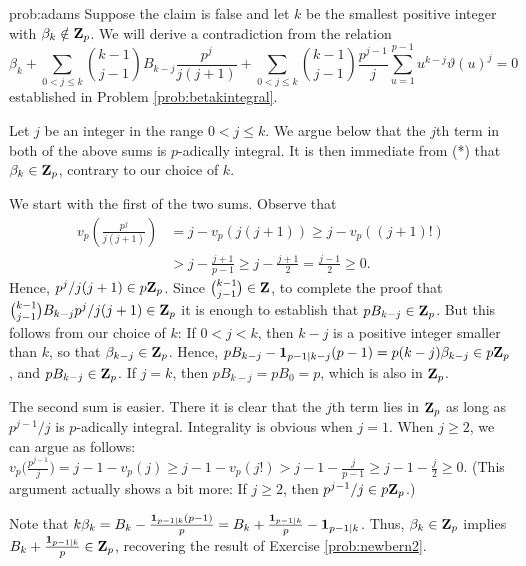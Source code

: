 \begin{sol}{prob:adams} Suppose the claim is false and let $k$ be the smallest positive integer with $\beta_k\notin \mathbf{Z}_{p}$. We will derive a contradiction from the relation
\begin{equation}\tag{*} \beta_k + \sum_{0 < j \le k} \binom{k-1}{j-1} B_{k-j}\frac{p^{j}}{j(j+1)}+\sum_{0 < j \le k}\binom{k-1}{j-1}\frac{p^{j-1}}{j}\sum_{u=1}^{p-1}u^{k-j}\vartheta(u)^j =0\end{equation}
established in Problem \ref{prob:betakintegral}.

Let $j$ be an integer in the range $0 < j \le k$. We argue below that the $j$th term in both of the above sums is $p$-adically integral. It is then immediate from (*) that $\beta_{k} \in \mathbf{Z}_{p}$, contrary to our choice of $k$.

We start with the first of the two sums. Observe that
\begin{align*} v_p\left(\frac{p^j}{j(j+1)}\right) &= j - v_p(j(j+1)) \ge j - v_p((j+1)!) \\&> j - \frac{j+1}{p-1} \ge j -\frac{j+1}{2} = \frac{j-1}{2} \ge 0. \end{align*}
Hence, $p^j/j(j+1) \in p\mathbf{Z}_{p}$. Since $\binom{k-1}{j-1} \in \mathbf{Z}$, to complete the proof that $\binom{k-1}{j-1} B_{k-j} p^j/j(j+1) \in \mathbf{Z}_{p}$ it is enough to establish that $pB_{k-j} \in \mathbf{Z}_{p}$. But this follows from our choice of $k$: If $0 < j < k$, then $k-j$ is a positive integer smaller than $k$, so that $\beta_{k-j} \in \mathbf{Z}_{p}$. Hence, $pB_{k-j} - \mathbf{1}_{p-1\mid k-j}(p-1) = p(k-j)\beta_{k-j}  \in p\mathbf{Z}_{p}$, and $pB_{k-j} \in \mathbf{Z}_{p}$. If $j=k$, then $pB_{k-j} = pB_0=p$, which is also in $\mathbf{Z}_{p}$. 

The second sum is easier. There it is clear that the $j$th term lies in $\mathbf{Z}_{p}$ as long as $p^{j-1}/j$ is $p$-adically integral. Integrality is obvious when $j=1$. When $j\ge 2$, we can argue as follows: $v_p\big(\frac{p^{j-1}}{j}\big) = j-1 - v_p(j) \ge j-1 - v_p(j!) > j-1 - \frac{j}{p-1} \ge j-1 -\frac{j}{2}  \ge 0$. (This argument actually shows a bit more: If $j\ge 2$, then $p^{j-1}/j \in p\mathbf{Z}_{p}$.)

\begin{rmk} Note that   $k\beta_{k} = B_k - \frac{\mathbf{1}_{p-1 \mid k} (p-1)}{p} = B_k +\frac{\mathbf{1}_{p-1\mid k}}{p}- \mathbf{1}_{p-1\mid k}$. Thus, $\beta_k\in \mathbf{Z}_{p}$ implies $B_k +\frac{\mathbf{1}_{p-1\mid k}}{p} \in \mathbf{Z}_{p}$, recovering the result of Exercise \ref{prob:newbern2}. 
\end{rmk}
\end{sol}




